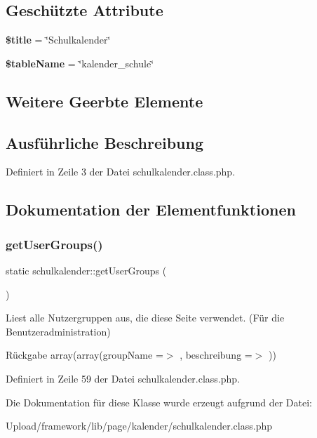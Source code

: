 \subsection*{Geschützte Attribute}
\begin{DoxyCompactItemize}
\item 
\mbox{\label{classschulkalender_a1aae1eff6751cd0f43716ab6a0c9305a}} 
{\bfseries \$title} = \char`\"{}Schulkalender\char`\"{}
\item 
\mbox{\label{classschulkalender_aa263e97a1ba9cc48eb4ccadfe46a596b}} 
{\bfseries \$table\+Name} = \char`\"{}kalender\+\_\+schule\char`\"{}
\end{DoxyCompactItemize}
\subsection*{Weitere Geerbte Elemente}


\subsection{Ausführliche Beschreibung}


Definiert in Zeile 3 der Datei schulkalender.\+class.\+php.



\subsection{Dokumentation der Elementfunktionen}
\mbox{\label{classschulkalender_adb45caaeceec2f212ceba5d882ffc089}} 
\subsubsection{\texorpdfstring{get\+User\+Groups()}{getUserGroups()}}
{\footnotesize\ttfamily static schulkalender\+::get\+User\+Groups (\begin{DoxyParamCaption}{ }\end{DoxyParamCaption})\hspace{0.3cm}{\ttfamily [static]}}

Liest alle Nutzergruppen aus, die diese Seite verwendet. (Für die Benutzeradministration) \begin{DoxyReturn}{Rückgabe}
array(array(\textquotesingle{}group\+Name\textquotesingle{} =$>$ \textquotesingle{}\textquotesingle{}, \textquotesingle{}beschreibung\textquotesingle{} =$>$ \textquotesingle{}\textquotesingle{})) 
\end{DoxyReturn}


Definiert in Zeile 59 der Datei schulkalender.\+class.\+php.



Die Dokumentation für diese Klasse wurde erzeugt aufgrund der Datei\+:\begin{DoxyCompactItemize}
\item 
Upload/framework/lib/page/kalender/schulkalender.\+class.\+php\end{DoxyCompactItemize}

